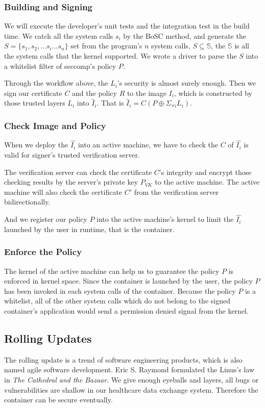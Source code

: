 \subsubsection{Building and Signing}

We will execute the developer's unit tests and the integration test in the build time.
We catch all the system calls $s_i$ by the BoSC\cite{1495942} method,
and generate the $S = \{s_1, s_2, \dots s_i \dots s_n\}$ set from the
program's $n$ system calls, $S \subseteq \mathbb{S}$, the $\mathbb{S}$ is all the system
calls that the kernel supported.  We wrote a driver to parse the $S$ into
a whitelist filter of seccomp's policy $P$.


Through the workflow above, the $L_i$'s security is almost surely enough.
Then we sign our certificate $C$ and the policy $R$ to the image $I_i$, which
is constructed by those trusted layers $L_i$ into $\hat I_{i}$. That is
$\hat I_{i} = C(P \oplus \Sigma_{\forall i} L_i)$.

\subsubsection{Check Image and Policy}
When we deploy the $\hat{I_i}$ into an active machine, we have to check the $C$ of
$\hat{I_i}$ is valid for signer's trusted verification server.

The verification server can check the certificate $C$'s integrity and encrypt those
checking results by the server's private key $P_{VK}$ to the active machine. The active
machine will also check the certificate $C'$ from the verification server bidirectionally.

And we register our policy $P$ into the active machine's kernel to limit the $\hat{I_i}$
launched by the user in runtime, that is the container.

\subsubsection{Enforce the Policy}

The kernel of the active machine can help us to guarantee the policy $P$ is enforced in
kernel space. Since the container is launched by the user, the policy $P$
has been invoked in each system calls of the container. Because the policy $P$ is a whitelist,
all of the other system calls which do not belong to the signed container's application
would send a permission denied signal from the kernel.

\subsection{Rolling Updates}

The rolling update is a trend of software engineering products, which is
also named agile software development. Eric S. Raymond formulated
the Linus's law in \emph{The Cathedral and the Bazaar}\cite{9780596001087}.
We give enough eyeballs and layers, all bugs or vulnerabilities are shallow in our
healthcare data exchange system. Therefore the container can be secure eventually.
